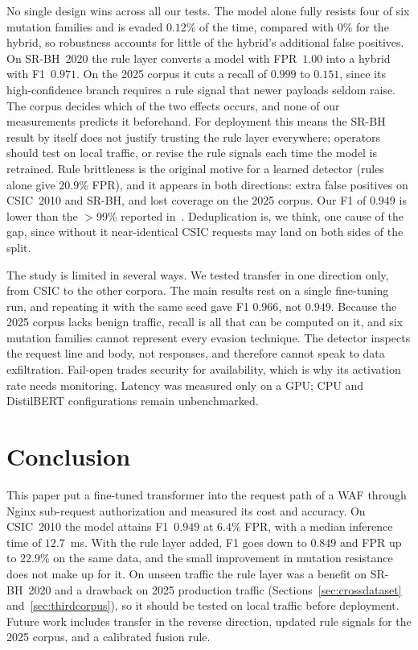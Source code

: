 \documentclass[conference]{IEEEtran}
\begin{document}
No single design wins across all our tests. The model alone fully resists
four of six mutation families and is evaded $0.12\%$ of the time, compared
with $0\%$ for the hybrid, so robustness accounts for little of the
hybrid's additional false positives. On SR-BH~2020 the rule layer converts
a model with FPR~$1.00$ into a hybrid with F1~$0.971$. On the 2025 corpus
it cuts a recall of $0.999$ to $0.151$, since its high-confidence branch
requires a rule signal that newer payloads seldom raise. The corpus decides
which of the two effects occurs, and none of our measurements predicts it
beforehand. For deployment this means the SR-BH result by itself does not
justify trusting the rule layer everywhere; operators should test on local
traffic, or revise the rule signals each time the model is retrained. Rule
brittleness is the original motive for a learned detector (rules alone give
$20.9\%$ FPR), and it appears in both directions: extra false positives on
CSIC~2010 and SR-BH, and lost coverage on the 2025 corpus. Our F1 of
$0.949$ is lower than the $>$99\% reported
in~\cite{wadbert2026,scireports2024novelxsssqli}. Deduplication is, we
think, one cause of the gap, since without it near-identical CSIC requests
may land on both sides of the split.

The study is limited in several ways. We tested transfer in one direction
only, from CSIC to the other corpora. The main results rest on a single
fine-tuning run, and repeating it with the same seed gave F1 $0.966$, not
$0.949$. Because the 2025 corpus lacks benign traffic, recall is all that
can be computed on it, and six mutation families cannot represent every
evasion technique. The detector inspects the request line and body, not
responses, and therefore cannot speak to data exfiltration. Fail-open
trades security for availability, which is why its activation rate needs
monitoring. Latency was measured only on a GPU; CPU and DistilBERT
configurations remain unbenchmarked.

\section{Conclusion}
This paper put a fine-tuned transformer into the request path of a WAF
through Nginx sub-request authorization and measured its cost and accuracy. On CSIC~2010 the model attains F1~$0.949$ at $6.4\%$ FPR,
with a median inference time of $12.7$~ms. With the rule layer added, F1
goes down to $0.849$ and FPR up to $22.9\%$ on the same data, and the small
improvement in mutation resistance does not make up for it. On unseen
traffic the rule layer was a benefit on SR-BH~2020 and a drawback on 2025
production traffic (Sections~\ref{sec:crossdataset}
and~\ref{sec:thirdcorpus}), so it should be tested on local traffic before
deployment. Future work includes transfer in the reverse direction,
updated rule signals for the 2025 corpus, and a calibrated fusion rule.

\footnotesize


\end{document}
